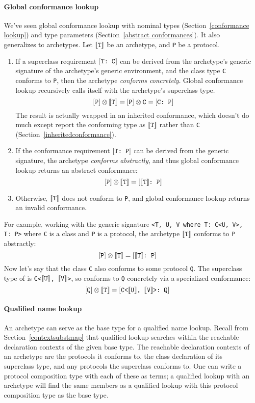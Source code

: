 \documentclass[../generics]{subfiles}
\begin{document}
\paragraph{Global conformance lookup} We've seen global conformance lookup with nominal types (Section~\ref{conformance lookup}) and type parameters (Section~\ref{abstract conformances}). It also generalizes to archetypes. Let $[\![\texttt{T}]\!]$ be an archetype, and \texttt{P} be a protocol.
\begin{enumerate}
\item If a superclass requirement $[\texttt{T:~C}]$ can be derived from the archetype's generic signature of the archetype's generic environment, and the class type \texttt{C} conforms to \texttt{P}, then the archetype \emph{conforms concretely}. Global conformance lookup recursively calls itself with the archetype's superclass type.
\[[\texttt{P}]\otimes[\![\texttt{T}]\!]=[\texttt{P}]\otimes\texttt{C}=[\texttt{C:~P}]\]
The result is actually wrapped in an inherited conformance, which doesn't do much except report the conforming type as $[\![\texttt{T}]\!]$ rather than \texttt{C} (Section~\ref{inheritedconformance}).
\item If the conformance requirement $[\texttt{T:~P}]$ can be derived from the generic signature, the archetype \emph{conforms abstractly}, and thus global conformance lookup returns an abstract conformance:
\[[\texttt{P}]\otimes[\![\texttt{T}]\!]=[\texttt{$[\![\texttt{T}]\!]$:~P}]\]
\item Otherwise, $[\![\texttt{T}]\!]$ does not conform to \texttt{P}, and global conformance lookup returns an invalid conformance.
\end{enumerate}
For example, working with the generic signature \verb|<T, U, V where T: C<U, V>, T: P>| where \texttt{C} is a class and \texttt{P} is a protocol, the archetype $[\![\texttt{T}]\!]$ conforms to \texttt{P} abstractly:
\[
[\texttt{P}]\otimes [\![\texttt{T}]\!] = [\texttt{$[\![\texttt{T}]\!]$:~P}]
\]
Now let's say that the class \texttt{C} also conforms to some protocol \texttt{Q}. The superclass type of  is \texttt{C<$[\![\texttt{U}]\!]$, $[\![\texttt{V}]\!]$>}, so  conforms to \texttt{Q} concretely via a specialized conformance:
\[
[\texttt{Q}]\otimes [\![\texttt{T}]\!] = [\texttt{C<$[\![\texttt{U}]\!]$, $[\![\texttt{V}]\!]$>:~Q}]
\]

\paragraph{Qualified name lookup} An archetype can serve as the base type for a qualified name lookup. Recall from Section~\ref{contextsubstmap} that qualified lookup searches within the reachable declaration contexts of the given base type. The reachable declaration contexts of an archetype are the protocols it conforms to, the class declaration of its superclass type, and any protocols the superclass conforms to. One can write a protocol composition type with each of these as terms; a qualified lookup with an archetype will find the same members as a qualified lookup with this protocol composition type as the base type.
\end{document}
